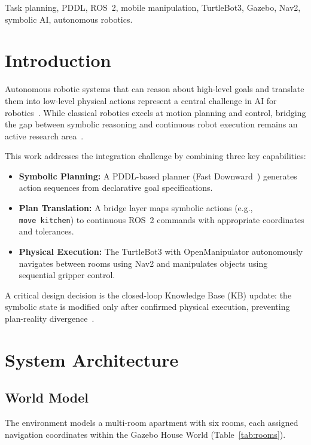 \documentclass[conference]{IEEEtran}
\begin{document}
\begin{IEEEkeywords}
Task planning, PDDL, ROS~2, mobile manipulation, TurtleBot3, Gazebo, Nav2, symbolic AI, autonomous robotics.
\end{IEEEkeywords}

\section{Introduction}

Autonomous robotic systems that can reason about high-level goals and translate them into low-level physical actions represent a central challenge in AI for robotics~\cite{ghallab2004}. While classical robotics excels at motion planning and control, bridging the gap between symbolic reasoning and continuous robot execution remains an active research area~\cite{kaelbling2011}.

This work addresses the integration challenge by combining three key capabilities:
\begin{itemize}
\item \textbf{Symbolic Planning:} A PDDL-based planner (Fast Downward~\cite{helmert2006}) generates action sequences from declarative goal specifications.
\item \textbf{Plan Translation:} A bridge layer maps symbolic actions (e.g., \texttt{move~kitchen}) to continuous ROS~2 commands with appropriate coordinates and tolerances.
\item \textbf{Physical Execution:} The TurtleBot3 with OpenManipulator autonomously navigates between rooms using Nav2 and manipulates objects using sequential gripper control.
\end{itemize}

A critical design decision is the closed-loop Knowledge Base (KB) update: the symbolic state is modified only after confirmed physical execution, preventing plan-reality divergence~\cite{ingrand2017}.

\section{System Architecture}

\subsection{World Model}

The environment models a multi-room apartment with six rooms, each assigned navigation coordinates within the Gazebo House World (Table~\ref{tab:rooms}).
\end{document}

